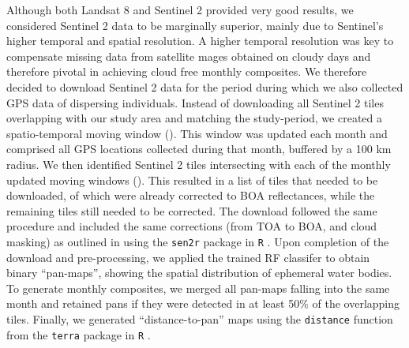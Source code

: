 \documentclass[abstract=on,10pt,a4paper,bibliography=totocnumbered]{article}
\newcommand{\inputy}[1]{\unskip}
\begin{document}
Although both Landsat 8 and Sentinel 2 provided very good results, we considered
Sentinel 2 data to be marginally superior, mainly due to Sentinel's higher
temporal and spatial resolution. A higher temporal resolution was key to
compensate missing data from satellite mages obtained on cloudy days and
therefore pivotal in achieving cloud free monthly composites. We therefore
decided to download Sentinel 2 data for the period during which we also
collected GPS data of dispersing individuals. Instead of downloading all
Sentinel 2 tiles overlapping with our study area and matching the study-period,
we created a spatio-temporal moving window (). This window
was updated each month and comprised all GPS locations collected during that
month, buffered by a 100 km radius. We then identified Sentinel 2 tiles
intersecting with each of the monthly updated moving windows
(). This resulted in a list of
\inputy{GeneralMetrics/NumberTilesTotal} tiles that needed to be downloaded,
\inputy{GeneralMetrics/NumberTiles2A} of which were already corrected to BOA
reflectances, while the remaining \inputy{GeneralMetrics/NumberTiles1C} tiles
still needed to be corrected. The download followed the same procedure and
included the same corrections (from TOA to BOA, and cloud masking) as outlined
in  using the \texttt{sen2r} package in \texttt{R}
\citep{Ranghetti.2020}. Upon completion of the download and pre-processing, we
applied the trained RF classifer to obtain binary ``pan-maps'', showing the
spatial distribution of ephemeral water bodies. To generate monthly composites,
we merged all pan-maps falling into the same month and retained pans if they
were detected in at least 50\% of the overlapping tiles. Finally, we generated
``distance-to-pan'' maps using the \texttt{distance} function from the
\texttt{terra} package in \texttt{R} \citep{Hijmans.2024}.
\end{document}
